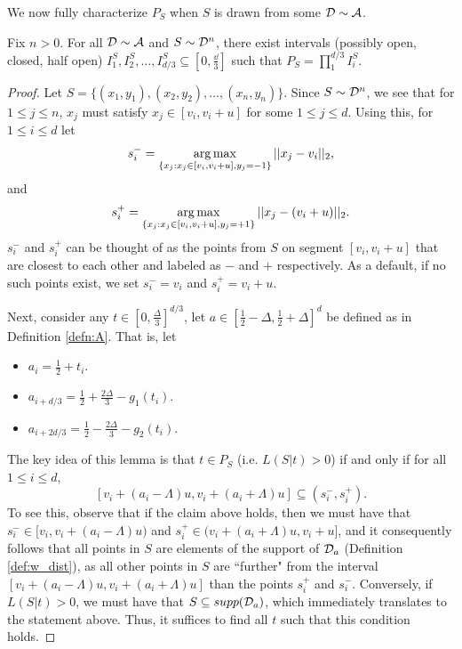 We now fully characterize $P_S$ when $S$ is drawn from some ${\mathcal D} \sim \mathcal{A}$.

\begin{lem}\label{lem:intervals}
Fix $n > 0$. For all ${\mathcal D} \sim \mathcal{A}$ and $S \sim {\mathcal D}^n$, there exist intervals (possibly open, closed, half open) $I_1^S, I_2^S, \dots, I_{d/3}^S \subseteq [0, \frac{\dd}{3}]$ such that $P_S = \prod_1^{d/3} I_i^S$.
\end{lem}

\begin{proof}
Let $S = \{(x_1, y_1), (x_2, y_2), \dots, (x_n, y_n)\}$. Since $S \sim {\mathcal D}^n$, we see that for $1 \leq j \leq n$, $x_j$ must satisfy $x_j \in [v_i, v_i + u]$ for some $1 \leq j \leq d$. Using this, for $1 \leq i \leq d$ let $$s_i^- = \operatorname*{arg\,max}_{\{x_j: x_j \in [v_i, v_i + u], y_j = -1\}} ||x_j - v_i||_2,$$ and $$s_i^+ = \operatorname*{arg\,max}_{\{x_j: x_j \in [v_i, v_i + u], y_j = +1\}} ||x_j - (v_i+ u)||_2.$$ $s_i^-$ and $s_i^+$ can be thought of as the points from $S$ on segment $[v_i, v_i + u]$ that are closest to each other and labeled as $-$ and $+$ respectively. As a default, if no such points exist, we set $s_i^- = v_i$ and $s_i^+ = v_i + u$. 

Next, consider any $t \in [0, \frac{\Delta}{3}]^{d/3}$, let $a \in [\frac{1}{2} - \Delta, \frac{1}{2} + \Delta]^d$ be defined as in Definition \ref{defn:A}. That is, let 
\begin{itemize}
	\item $a_i = \frac{1}{2} + t_i$.
	\item $a_{i + d/3} = \frac{1}{2} + \frac{2\Delta}{3} - g_1(t_i)$.
	\item $a_{i + 2d/3} = \frac{1}{2} - \frac{2\Delta}{3} - g_2(t_i)$. 
\end{itemize}
The key idea of this lemma is that $t \in P_S$ (i.e. $L(S|t) > 0$) if and only if for all $1 \leq i \leq d$, $$[v_i + (a_i - \Lambda)u, v_i + (a_i + \Lambda)u] \subseteq (s_i^-, s_i^+).$$  To see this, observe that if the claim above holds, then we must have that $s_i^- \in [v_i, v_i + (a_i - \Lambda)u)$ and $s_i^+ \in (v_i + (a_i + \Lambda)u, v_i + u]$, and it consequently follows that all points in $S$ are elements of the support of ${\mathcal D}_a$ (Definition \ref{def:w_dist}), as all other points in $S$ are ``further" from the interval $[v_i + (a_i - \Lambda)u, v_i + (a_i + \Lambda)u]$ than the points $s_i^+$ and $s_i^-$. Conversely, if $L(S|t) > 0$, we must have that $S \subseteq supp({\mathcal D}_a)$, which immediately translates to the statement above. Thus, it suffices to find all $t$ such that this condition holds.


\end{proof}

